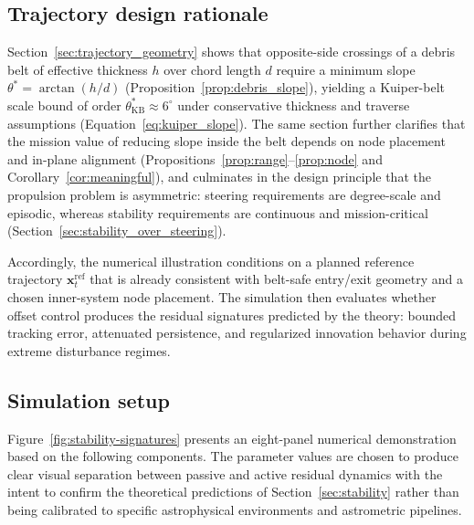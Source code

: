 \documentclass{article}
\begin{document}
\subsection{Trajectory design rationale}

Section~\ref{sec:trajectory_geometry} shows that opposite-side crossings of a debris belt of effective thickness $h$ over chord length $d$ require a minimum slope $\theta^*=\arctan(h/d)$ (Proposition~\ref{prop:debris_slope}), yielding a Kuiper-belt scale bound of order $\theta^*_{\mathrm{KB}}\approx 6^\circ$ under conservative thickness and traverse assumptions (Equation~\eqref{eq:kuiper_slope}). The same section further clarifies that the mission value of reducing slope inside the belt depends on node placement and in-plane alignment (Propositions~\ref{prop:range}--\ref{prop:node} and Corollary~\ref{cor:meaningful}), and culminates in the design principle that the propulsion problem is asymmetric: steering requirements are degree-scale and episodic, whereas stability requirements are continuous and mission-critical (Section~\ref{sec:stability_over_steering}).

Accordingly, the numerical illustration conditions on a planned reference trajectory $\mathbf{x}_t^{\mathrm{ref}}$ that is already consistent with belt-safe entry/exit geometry and a chosen inner-system node placement. The simulation then evaluates whether offset control produces the residual signatures predicted by the theory: bounded tracking error, attenuated persistence, and regularized innovation behavior during extreme disturbance regimes.

\subsection{Simulation setup}

Figure~\ref{fig:stability-signatures} presents an eight-panel numerical demonstration based on the following components. The parameter values are chosen to produce clear visual separation between passive and active residual dynamics with the intent to confirm the theoretical predictions of Section~\ref{sec:stability} rather than being calibrated to specific astrophysical environments and astrometric pipelines.
\end{document}
